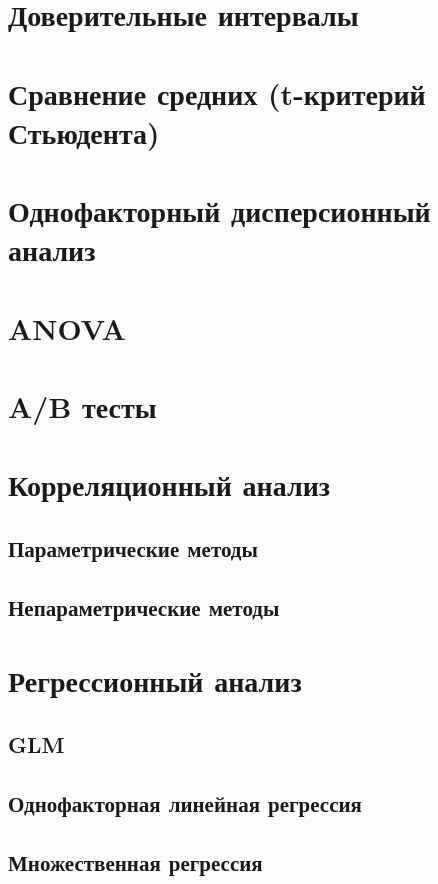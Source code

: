 \documentclass[]{scrartcl}
\begin{document}
\section{Доверительные интервалы}

\section{Сравнение средних (t-критерий Стьюдента)}

\section{Однофакторный дисперсионный анализ}

\section{ANOVA}

\section{A/B тесты}

\section{Корреляционный анализ}

\subsection{Параметрические методы}

\subsection{Непараметрические методы}

\section{Регрессионный анализ}

\subsection{GLM}

\subsection{Однофакторная линейная регрессия}

\subsection{Множественная регрессия}
\end{document}
